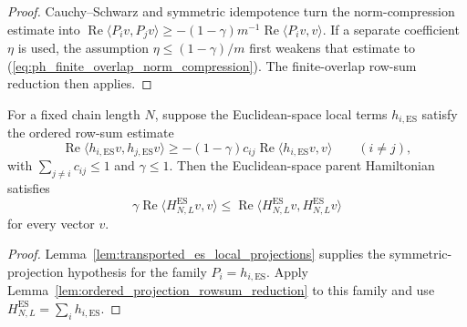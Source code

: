 \begin{proof}
    \leanok
    Cauchy--Schwarz and symmetric idempotence turn the norm-compression estimate
    into
    $\operatorname{Re}\langle P_i v,P_jv\rangle
        \ge -(1-\gamma)m^{-1}\operatorname{Re}\langle P_iv,v\rangle$.
    If a separate coefficient $\eta$ is used, the assumption
    $\eta\le(1-\gamma)/m$ first weakens that estimate to
    (\ref{eq:ph_finite_overlap_norm_compression}). The finite-overlap row-sum
    reduction then applies.
\end{proof}

\begin{lemma}
    \label{lem:parent_hamiltonian_ordered_rowsum_quadratic}
    \leanok
    For a fixed chain length $N$, suppose the Euclidean-space local terms
    $h_{i,\mathrm{ES}}$ satisfy the ordered row-sum estimate
    \begin{equation}\label{eq:ph_ordered_rowsum_estimate}
        \operatorname{Re}\langle h_{i,\mathrm{ES}} v,h_{j,\mathrm{ES}}v\rangle
        \ge -(1-\gamma)c_{ij}\operatorname{Re}\langle h_{i,\mathrm{ES}}v,v\rangle
        \qquad (i\ne j),
    \end{equation}
    with $\sum_{j\ne i}c_{ij}\le1$ and $\gamma\le1$. Then the
    Euclidean-space parent Hamiltonian satisfies
    \[
        \gamma\operatorname{Re}\langle H_{N,L}^{\mathrm{ES}}v,v\rangle
        \le
        \operatorname{Re}\langle H_{N,L}^{\mathrm{ES}}v,
        H_{N,L}^{\mathrm{ES}}v\rangle
    \]
    for every vector $v$.
\end{lemma}

\begin{proof}
    \leanok
    Lemma~\ref{lem:transported_es_local_projections} supplies the symmetric-projection
    hypothesis for the family $P_i=h_{i,\mathrm{ES}}$. Apply
    Lemma~\ref{lem:ordered_projection_rowsum_reduction} to this family and use
    $H_{N,L}^{\mathrm{ES}}=\sum_i h_{i,\mathrm{ES}}$.
\end{proof}

